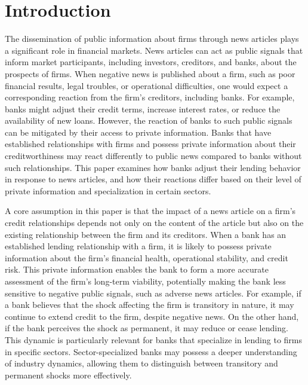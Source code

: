 \section{Introduction}

The dissemination of public information about firms through news articles plays a significant role in financial markets. News articles can act as public signals that inform market participants, including investors, creditors, and banks, about the prospects of firms. When negative news is published about a firm, such as poor financial results, legal troubles, or operational difficulties, one would expect a corresponding reaction from the firm's creditors, including banks. For example, banks might adjust their credit terms, increase interest rates, or reduce the availability of new loans. However, the reaction of banks to such public signals can be mitigated by their access to private information. Banks that have established relationships with firms and possess private information about their creditworthiness may react differently to public news compared to banks without such relationships. This paper examines how banks adjust their lending behavior in response to news articles, and how their reactions differ based on their level of private information and specialization in certain sectors.

A core assumption in this paper is that the impact of a news article on a firm's credit relationships depends not only on the content of the article but also on the existing relationship between the firm and its creditors. When a bank has an established lending relationship with a firm, it is likely to possess private information about the firm's financial health, operational stability, and credit risk. This private information enables the bank to form a more accurate assessment of the firm's long-term viability, potentially making the bank less sensitive to negative public signals, such as adverse news articles. For example, if a bank believes that the shock affecting the firm is transitory in nature, it may continue to extend credit to the firm, despite negative news. On the other hand, if the bank perceives the shock as permanent, it may reduce or cease lending. This dynamic is particularly relevant for banks that specialize in lending to firms in specific sectors. Sector-specialized banks may possess a deeper understanding of industry dynamics, allowing them to distinguish between transitory and permanent shocks more effectively.

